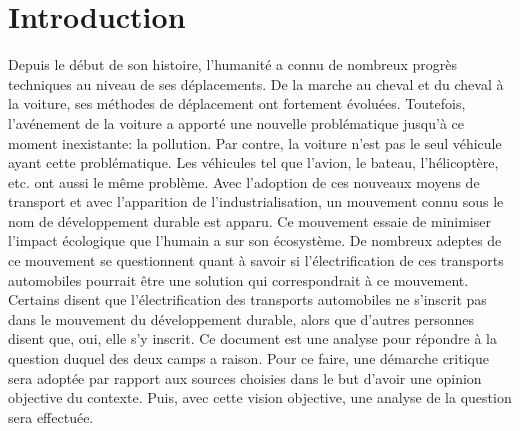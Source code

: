 
\chapter{Introduction}

Depuis le début de son histoire, l'humanité a connu de nombreux progrès techniques au niveau de ses déplacements. De la marche au cheval et du cheval à la voiture, ses méthodes de déplacement ont fortement évoluées. Toutefois, l'avénement de la voiture a apporté une nouvelle problématique jusqu'à ce moment inexistante: la pollution. Par contre, la voiture n'est pas le seul véhicule ayant cette problématique. Les véhicules tel que l'avion, le bateau, l'hélicoptère, etc. ont aussi le même problème. Avec l'adoption de ces nouveaux moyens de transport et avec l'apparition de l'industrialisation, un mouvement connu sous le nom de \og{}développement durable\fg{} est apparu. Ce mouvement essaie de minimiser l'impact écologique que l'humain a sur son écosystème. De nombreux adeptes de ce mouvement se questionnent quant à savoir si l'électrification de ces transports automobiles pourrait être une solution qui correspondrait à ce mouvement. Certains disent que l'électrification des transports automobiles ne s'inscrit pas dans le mouvement du développement durable, alors que d'autres personnes disent que, oui, elle s'y inscrit. Ce document est une analyse pour répondre à la question duquel des deux camps a raison. Pour ce faire, une démarche critique sera adoptée par rapport aux sources choisies dans le but d'avoir une opinion objective du contexte. Puis, avec cette vision objective, une analyse de la question sera effectuée.
